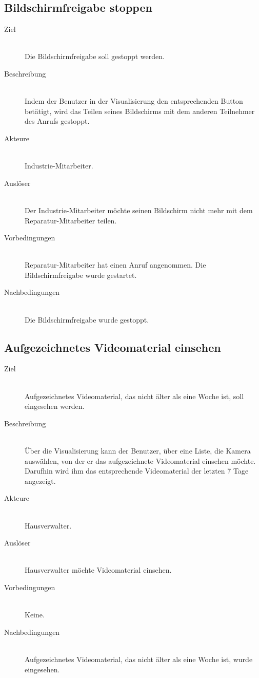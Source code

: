 \subsection{Bildschirmfreigabe stoppen}\label{subsec:bildschirmfreigabe-stoppen}
    \begin{description}
        \item[Ziel]\hfill \\
        Die Bildschirmfreigabe soll gestoppt werden.
        \item[Beschreibung]\hfill \\
        Indem der Benutzer in der Visualisierung den entsprechenden Button betätigt, wird das Teilen seines Bildschirms mit dem anderen Teilnehmer des Anrufs gestoppt.
        \item[Akteure]\hfill \\
        Industrie-Mitarbeiter.
        \item[Auslöser]\hfill \\
        Der Industrie-Mitarbeiter möchte seinen Bildschirm nicht mehr mit dem Reparatur-Mitarbeiter teilen.
        \item[Vorbedingungen]\hfill \\
        Reparatur-Mitarbeiter hat einen Anruf angenommen.
        Die Bildschirmfreigabe wurde gestartet.
        \item[Nachbedingungen]\hfill \\
        Die Bildschirmfreigabe wurde gestoppt.
        \end{description}

\subsection{Aufgezeichnetes Videomaterial einsehen}\label{subsec:aufgezeichnetes-videomaterial-einsehen}
    \begin{description}
        \item[Ziel]\hfill \\
        Aufgezeichnetes Videomaterial, das nicht älter als eine Woche ist, soll eingesehen werden.
        \item[Beschreibung]\hfill \\
        Über die Visualisierung kann der Benutzer, über eine Liste, die Kamera auswählen, von der er das aufgezeichnete Videomaterial einsehen möchte.
        Darufhin wird ihm das entsprechende Videomaterial der letzten 7 Tage angezeigt.
        \item[Akteure]\hfill \\
        Hausverwalter.
        \item[Auslöser]\hfill \\
        Hausverwalter möchte Videomaterial einsehen.
        \item[Vorbedingungen]\hfill \\
        Keine.
        \item[Nachbedingungen]\hfill \\
        Aufgezeichnetes Videomaterial, das nicht älter als eine Woche ist, wurde eingesehen.
        \end{description}   